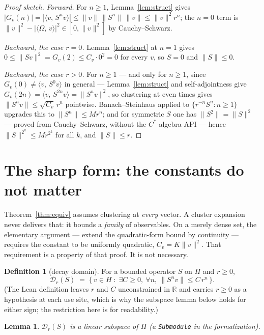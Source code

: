 \documentclass[11pt]{article}
\newtheorem{lemma}[theorem]{Lemma}
\theoremstyle{definition}
\newtheorem{definition}[theorem]{Definition}
\newcommand{\lean}[1]{\texttt{#1}}
\newcommand{\R}{\mathbb{R}}
\newcommand{\Om}{\Omega}
\newcommand{\inn}[2]{\langle #1,\, #2\rangle}
\begin{document}
\begin{proof}[Proof sketch]
\emph{Forward.}  For $n \ge 1$, Lemma~\ref{lem:struct} gives
$|G_v(n)| = |\inn{v}{S^n v}| \le \|v\|\,\|S^n\|\,\|v\| \le \|v\|^2 r^n$;
the $n = 0$ term is $\|v\|^2 - |\inn{\Om}{v}|^2 \in [0,\|v\|^2]$ by
Cauchy--Schwarz.

\emph{Backward, the case $r = 0$.}  Lemma~\ref{lem:struct} at $n = 1$
gives $0 \le \|Sv\|^2 = G_v(2) \le C_v\cdot 0^2 = 0$ for every $v$, so
$S = 0$ and $\|S\| \le 0$.

\emph{Backward, the case $r > 0$.}  For $n \ge 1$ --- and only for
$n \ge 1$, since $G_v(0) \ne \inn{v}{S^0 v}$ in general ---
Lemma~\ref{lem:struct} and self-adjointness give
$G_v(2n) = \inn{v}{S^{2n}v} = \|S^n v\|^2$, so clustering at even times
gives $\|S^n v\| \le \sqrt{C_v}\,r^n$ pointwise.  Banach--Steinhaus
applied to $\{r^{-n}S^n : n \ge 1\}$ upgrades this to $\|S^n\| \le M r^n$;
and for symmetric $S$ one has $\|S^2\| = \|S\|^2$ --- proved from
Cauchy--Schwarz, without the $C^*$-algebra API --- hence
$\|S\|^{2^k} \le M r^{2^k}$ for all $k$, and $\|S\| \le r$.
\end{proof}

\section{The sharp form: the constants do not matter}
\label{sec:sharp}

Theorem~\ref{thm:equiv} assumes clustering at \emph{every} vector.  A
cluster expansion never delivers that: it bounds a \emph{family} of
observables.  On a merely dense set, the elementary argument --- extend
the quadratic-form bound by continuity --- requires the constant to be
uniformly quadratic, $C_v = K\|v\|^2$.  That requirement is a property of
that proof.  It is not necessary.

\begin{definition}[decay domain]
\label{def:decay}
For a bounded operator $S$ on $H$ and $r \ge 0$,
\[
  \mathcal{D}_r(S) \;=\; \bigl\{\, v \in H \;:\; \exists C \ge 0,\
  \forall n,\ \|S^n v\| \le C\,r^n \,\bigr\}.
\]
(The Lean definition leaves $r$ and $C$ unconstrained in $\R$ and carries
$r \ge 0$ as a hypothesis at each use site, which is why the subspace
lemma below holds for either sign; the restriction here is for
readability.)
\end{definition}

\begin{lemma}
\label{lem:submodule}
$\mathcal{D}_r(S)$ is a linear subspace of $H$ (a \lean{Submodule} in the
formalization).
\end{lemma}
\end{document}

